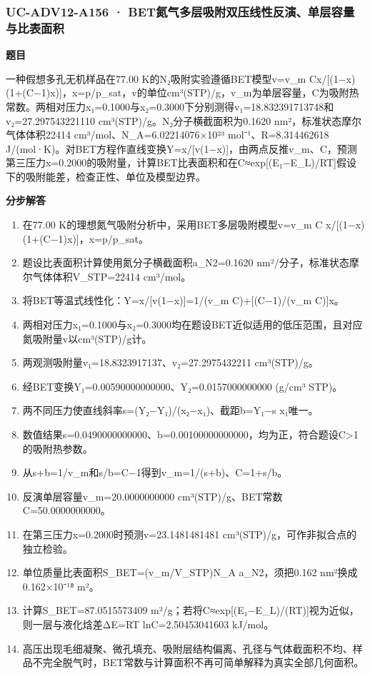 \documentclass[UTF8,11pt,a4paper]{ctexart}
\begin{document}
\subsubsection*{UC-ADV12-A156 · BET氮气多层吸附双压线性反演、单层容量与比表面积}
\noindent\textbf{题目}\par
一种假想多孔无机样品在77.00 K的N₂吸附实验遵循BET模型v=v\_m Cx/[(1−x)(1+(C−1)x)]，x=p/p\_sat，v的单位cm³(STP)/g，v\_m为单层容量，C为吸附热常数。两相对压力x₁=0.1000与x₂=0.3000下分别测得v₁=18.832391713748和v₂=27.297543221110 cm³(STP)/g。N₂分子横截面积为0.1620 nm²，标准状态摩尔气体体积22414 cm³/mol、N\_A=6.02214076×10²³ mol⁻¹、R=8.314462618 J/(mol·K)。对BET方程作直线变换Y=x/[v(1−x)]，由两点反推v\_m、C，预测第三压力x=0.2000的吸附量，计算BET比表面积和在C≈exp[(E₁−E\_L)/RT]假设下的吸附能差，检查正性、单位及模型边界。\par
\medskip\noindent\textbf{分步解答}
\begin{enumerate}
\item 在77.00 K的理想氮气吸附分析中，采用BET多层吸附模型v=v\_m C x/[(1−x)(1+(C−1)x)]，x=p/p\_sat。
\item 题设比表面积计算使用氮分子横截面积a\_N2=0.1620 nm²/分子，标准状态摩尔气体体积V\_STP=22414 cm³/mol。
\item 将BET等温式线性化：Y=x/[v(1−x)]=1/(v\_m C)+[(C−1)/(v\_m C)]x。
\item 两相对压力x₁=0.1000与x₂=0.3000均在题设BET近似适用的低压范围，且对应氮吸附量v以cm³(STP)/g计。
\item 两观测吸附量v₁=18.8323917137、v₂=27.2975432211 cm³(STP)/g。
\item 经BET变换Y₁=0.00590000000000、Y₂=0.0157000000000 (g/cm³ STP)。
\item 两不同压力使直线斜率s=(Y₂−Y₁)/(x₂−x₁)、截距b=Y₁−s x₁唯一。
\item 数值结果s=0.0490000000000、b=0.00100000000000，均为正，符合题设C>1的吸附热参数。
\item 从s+b=1/v\_m和s/b=C−1得到v\_m=1/(s+b)、C=1+s/b。
\item 反演单层容量v\_m=20.0000000000 cm³(STP)/g、BET常数C=50.0000000000。
\item 在第三压力x=0.2000时预测v=23.1481481481 cm³(STP)/g，可作非拟合点的独立检验。
\item 单位质量比表面积S\_BET=(v\_m/V\_STP)N\_A a\_N2，须把0.162 nm²换成0.162×10⁻¹⁸ m²。
\item 计算S\_BET=87.0515573409 m²/g；若将C≈exp[(E₁−E\_L)/(RT)]视为近似，则一层与液化焓差ΔE=RT lnC=2.50453041603 kJ/mol。
\item 高压出现毛细凝聚、微孔填充、吸附层结构偏离、孔径与气体截面积不均、样品不完全脱气时，BET常数与计算面积不再可简单解释为真实全部几何面积。
\end{enumerate}
\end{document}
